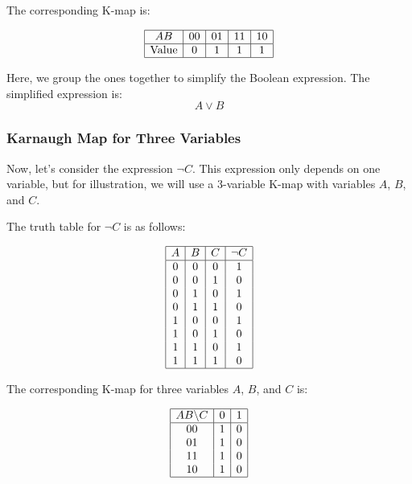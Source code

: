 The corresponding K-map is:

\[
	\begin{array}{|c|c|c|c|c|}
		\hline
		AB           & 00 & 01 & 11 & 10 \\
		\hline
		\text{Value} & 0  & 1  & 1  & 1  \\
		\hline
	\end{array}
\]

Here, we group the ones together to simplify the Boolean expression. The simplified expression is:
\[
	A \lor B
\]

\subsubsection{Karnaugh Map for Three Variables}

Now, let's consider the expression \( \neg C \). This expression only 
depends on one variable, but for illustration, we will use a 
3-variable K-map with variables \( A \), \( B \), and \( C \).
\vspace{\baselineskip}

The truth table for \( \neg C \) is as follows:

\[
	\begin{array}{|c|c|c|c|}
		\hline
		A & B & C & \neg C \\
		\hline
		0 & 0 & 0 & 1      \\
		0 & 0 & 1 & 0      \\
		0 & 1 & 0 & 1      \\
		0 & 1 & 1 & 0      \\
		1 & 0 & 0 & 1      \\
		1 & 0 & 1 & 0      \\
		1 & 1 & 0 & 1      \\
		1 & 1 & 1 & 0      \\
		\hline
	\end{array}
\]

The corresponding K-map for three variables \( A \), \( B \), and \( C \) is:

\[
	\begin{array}{|c|c|c|c|}
		\hline
		AB \backslash C & 0 & 1 \\
		\hline
		00              & 1 & 0 \\
		01              & 1 & 0 \\
		11              & 1 & 0 \\
		10              & 1 & 0 \\
		\hline
	\end{array}
\]

